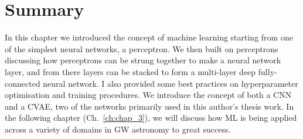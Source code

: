 \section{Summary}

In this chapter we introduced the concept of machine learning 
starting from one of the simplest neural networks, a perceptron. We 
then built on perceptrons discussing how perceptrons can be strung 
together to make a neural network layer, and from there layers 
can be stacked to form a multi-layer deep fully-connected neural network. 
I also provided some best practices on hyperparameter optimisation and 
training procedures. We introduce the concept of both a \ac{CNN} 
and a \ac{CVAE}, two of the networks primarily used in this author's 
thesis work. In the following chapter (Ch.~\ref{ch:chap_3}), we will 
discuss how \ac{ML} is being applied across a variety of domains in 
\ac{GW} astronomy to great success. 
